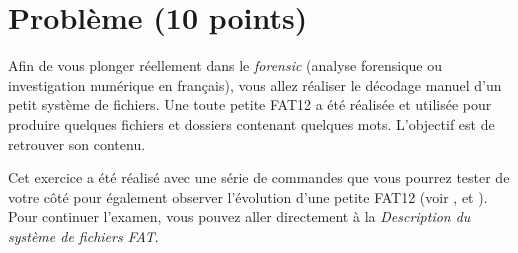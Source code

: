 \documentclass[11pt,a4paper]{article}
\begin{document}
\vfillLast

\clearpage


\section{Problème (10 points)}


Afin de vous plonger réellement dans le \textit{forensic} (analyse forensique ou investigation numérique en français), vous allez réaliser le décodage manuel d'un petit système de fichiers.
Une toute petite FAT12 a été réalisée et utilisée pour produire quelques fichiers et dossiers contenant quelques mots.
L'objectif est de retrouver son contenu.

\smallskip

Cet exercice a été réalisé avec une série de commandes que vous pourrez tester de votre côté pour également observer l'évolution d'une petite FAT12 (voir ,  et ).
Pour continuer l'examen, vous pouvez aller directement à la \textit{Description du système de fichiers FAT}.

\end{document}
